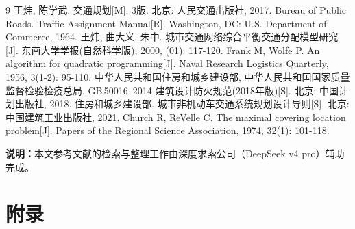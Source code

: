 \documentclass[UTF8,zihao=-4,a4paper]{ctexart}
\numberwithin{table}{section}
\numberwithin{figure}{section}
\numberwithin{equation}{section}
\begin{document}
\begin{thebibliography}{9}
 王炜, 陈学武. 交通规划[M]. 3版. 北京: 人民交通出版社, 2017.
 Bureau of Public Roads. Traffic Assignment Manual[R]. Washington, DC: U.S. Department of Commerce, 1964.
 王炜, 曲大义, 朱中. 城市交通网络综合平衡交通分配模型研究[J]. 东南大学学报(自然科学版), 2000, (01): 117-120.
 Frank M, Wolfe P. An algorithm for quadratic programming[J]. Naval Research Logistics Quarterly, 1956, 3(1-2): 95-110.
 中华人民共和国住房和城乡建设部, 中华人民共和国国家质量监督检验检疫总局. GB\,50016--2014 建筑设计防火规范(2018年版)[S]. 北京: 中国计划出版社, 2018.
 住房和城乡建设部. 城市非机动车交通系统规划设计导则[S]. 北京: 中国建筑工业出版社, 2021.
 Church R, ReVelle C. The maximal covering location problem[J]. Papers of the Regional Science Association, 1974, 32(1): 101-118.
\end{thebibliography}

\vspace{1em}
\noindent\textbf{说明：}本文参考文献的检索与整理工作由深度求索公司（DeepSeek v4 pro）辅助完成。

\newpage
\section*{附\quad 录}
\end{document}
